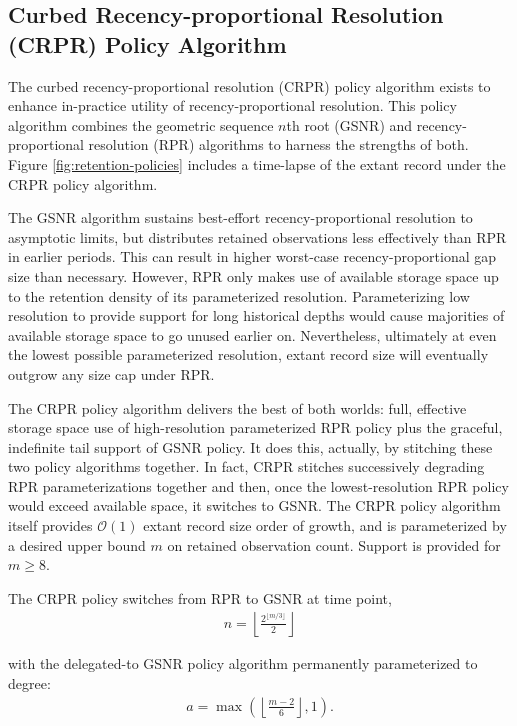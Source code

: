 \subsection{Curbed Recency-proportional Resolution (CRPR) Policy Algorithm}
\label{sec:curbed-recency-proportional-resolution-algo}

The curbed recency-proportional resolution (CRPR) policy algorithm exists to enhance in-practice utility of recency-proportional resolution.
This policy algorithm combines the geometric sequence $n$th root (GSNR) and recency-proportional resolution (RPR) algorithms to harness the strengths of both.
Figure \ref{fig:retention-policies} includes a time-lapse of the extant record under the CRPR policy algorithm.

The GSNR algorithm sustains best-effort recency-proportional resolution to asymptotic limits, but distributes retained observations less effectively than RPR in earlier periods.
This can result in higher worst-case recency-proportional gap size than necessary.
However, RPR only makes use of available storage space up to the retention density of its parameterized resolution.
Parameterizing low resolution to provide support for long historical depths would cause majorities of available storage space to go unused earlier on.
Nevertheless, ultimately at even the lowest possible parameterized resolution, extant record size will eventually outgrow any size cap under RPR.

The CRPR policy algorithm delivers the best of both worlds: full, effective storage space use of high-resolution parameterized RPR policy plus the graceful, indefinite tail support of GSNR policy.
It does this, actually, by stitching these two policy algorithms together.
In fact, CRPR stitches successively degrading RPR parameterizations together and then, once the lowest-resolution RPR policy would exceed available space, it switches to GSNR.
The CRPR policy algorithm itself provides $\mathcal{O}(1)$ extant record size order of growth, and is parameterized by a desired upper bound $m$ on retained observation count.
Support is provided for $m \geq 8$.

The CRPR policy switches from RPR to GSNR at time point,
\begin{align*}
n = \left\lfloor \frac{2^{\lfloor m/3 \rfloor}}{2} \right\rfloor
\end{align*}

with the delegated-to GSNR policy algorithm permanently parameterized to degree:
\begin{align*}
a = \max \left(
  \left\lfloor \frac{m - 2}{6} \right\rfloor,
  1
\right).
\end{align*}


